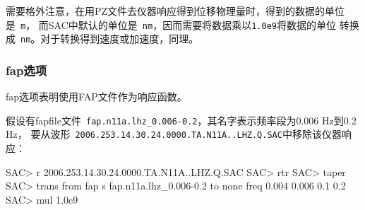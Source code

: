 需要格外注意，在用PZ文件去仪器响应得到位移物理量时，得到的数据的单位是~\verb+m+，
而SAC中默认的单位是~\verb+nm+，因而需要将数据乘以\verb+1.0e9+将数据的单位
转换成~\verb+nm+。对于转换得到速度或加速度，同理。

\subsubsection{fap选项}
fap选项表明使用FAP文件作为响应函数。

假设有fapfile文件~\verb+fap.n11a.lhz_0.006-0.2+，其名字表示频率段为0.006 Hz到0.2 Hz，
要从波形~\verb+2006.253.14.30.24.0000.TA.N11A..LHZ.Q.SAC+中移除该仪器响应：
\begin{SACCode}
SAC> r 2006.253.14.30.24.0000.TA.N11A..LHZ.Q.SAC
SAC> rtr
SAC> taper
SAC> trans from fap s fap.n11a.lhz_0.006-0.2 to none freq 0.004 0.006 0.1 0.2
SAC> mul 1.0e9
\end{SACCode}
